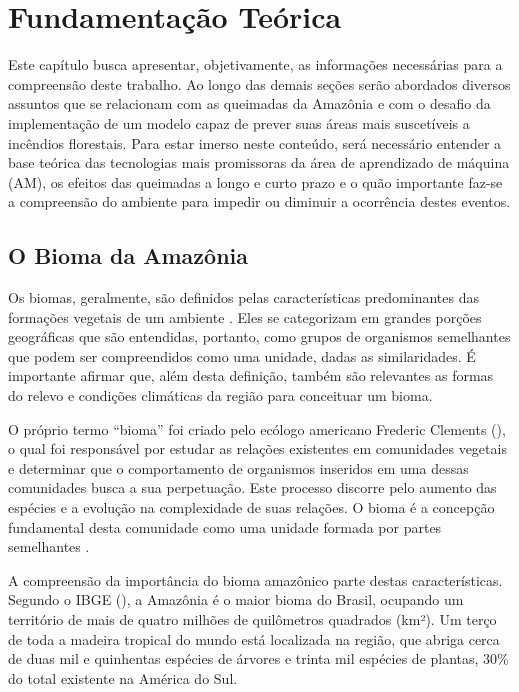 \chapter{Fundamentação Teórica}

Este capítulo busca apresentar, objetivamente, as informações necessárias para a compreensão deste trabalho. Ao longo das demais seções serão abordados diversos assuntos que se relacionam com as queimadas da Amazônia e com o desafio da implementação de um modelo capaz de prever suas áreas mais suscetíveis a incêndios florestais. Para estar imerso neste conteúdo, será necessário entender a base teórica das tecnologias mais promissoras da área de aprendizado de máquina (AM), os efeitos das queimadas a longo e curto prazo e o quão importante faz-se a compreensão do ambiente para impedir ou diminuir a ocorrência destes eventos.

\section{O Bioma da Amazônia}

Os biomas, geralmente, são definidos pelas características predominantes das formações vegetais de um ambiente \cite{TIMM05}. Eles se categorizam em grandes porções geográficas que são entendidas, portanto, como grupos de organismos semelhantes que podem ser compreendidos como uma unidade, dadas as similaridades. É importante afirmar que, além desta definição, também são relevantes as formas do relevo e condições climáticas da região para conceituar um bioma.

O próprio termo ``bioma'' foi criado pelo ecólogo americano Frederic Clements (\citeyear{clements1916}), o qual foi responsável por estudar as relações existentes em comunidades vegetais e determinar que o comportamento de organismos inseridos em uma dessas comunidades busca a sua perpetuação. Este processo discorre pelo aumento das espécies e a evolução na complexidade de suas relações. O bioma é a concepção fundamental desta comunidade como uma unidade formada por partes semelhantes \cite{TIMM05}.

A compreensão da importância do bioma amazônico parte destas características. Segundo o IBGE (\citeyear{ibge04:mapabioma}), a Amazônia é o maior bioma do Brasil, ocupando um território de mais de quatro milhões de quilômetros quadrados (km²). Um terço de toda a madeira tropical do mundo está localizada na região, que abriga cerca de duas mil e quinhentas espécies de árvores e trinta mil espécies de plantas, 30\% do total existente na América do Sul.

